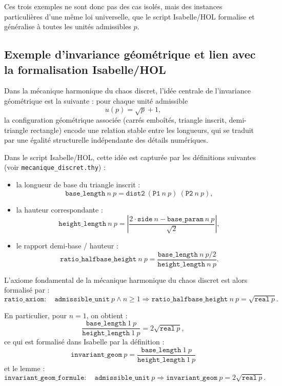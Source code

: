 \documentclass[12pt,a4paper]{article}
\theoremstyle{definition}
\theoremstyle{remark}
\begin{document}
Ces trois exemples ne sont donc pas des cas isolés, mais des instances
particulières d'une même loi universelle, que le script Isabelle/HOL
formalise et généralise à toutes les unités admissibles $p$.

\subsection{Exemple d'invariance géométrique et lien avec la formalisation Isabelle/HOL}

Dans la mécanique harmonique du chaos discret, l'idée centrale de l'invariance
géométrique est la suivante : pour chaque unité admissible
\[
  u(p) = \sqrt{p} + 1,
\]
la configuration géométrique associée (carrés emboîtés, triangle inscrit,
demi-triangle rectangle) encode une relation stable entre les longueurs, qui
se traduit par une égalité structurelle indépendante des détails numériques.

Dans le script Isabelle/HOL, cette idée est capturée par les définitions
suivantes (voir \texttt{mecanique\_discret.thy}) :
\begin{itemize}
  \item la longueur de base du triangle inscrit :
  \[
    \texttt{base\_length}\ n\ p = \texttt{dist2}\ (\texttt{P1}\ n\ p)\ (\texttt{P2}\ n\ p),
  \]
  \item la hauteur correspondante :
  \[
    \texttt{height\_length}\ n\ p =
      \left|\frac{2 \cdot \texttt{side}\ n - \texttt{base\_param}\ n\ p}{\sqrt{2}}\right|,
  \]
  \item le rapport demi-base / hauteur :
  \[
    \texttt{ratio\_halfbase\_height}\ n\ p =
      \frac{\texttt{base\_length}\ n\ p / 2}{\texttt{height\_length}\ n\ p}.
  \]
\end{itemize}

L'axiome fondamental de la mécanique harmonique du chaos discret est alors
formalisé par :
\[
  \texttt{ratio\_axiom} :
  \quad \texttt{admissible\_unit}\ p \wedge n \ge 1
  \Longrightarrow
  \texttt{ratio\_halfbase\_height}\ n\ p = \sqrt{\texttt{real}\ p}.
\]

En particulier, pour $n = 1$, on obtient :
\[
  \frac{\texttt{base\_length}\ 1\ p}{\texttt{height\_length}\ 1\ p}
  = 2 \sqrt{\texttt{real}\ p},
\]
ce qui est formalisé dans Isabelle par la définition :
\[
  \texttt{invariant\_geom}\ p =
    \frac{\texttt{base\_length}\ 1\ p}{\texttt{height\_length}\ 1\ p}
\]
et le lemme :
\[
  \texttt{invariant\_geom\_formule} :
  \quad \texttt{admissible\_unit}\ p
  \Longrightarrow
  \texttt{invariant\_geom}\ p = 2 \sqrt{\texttt{real}\ p}.
\]
\end{document}
